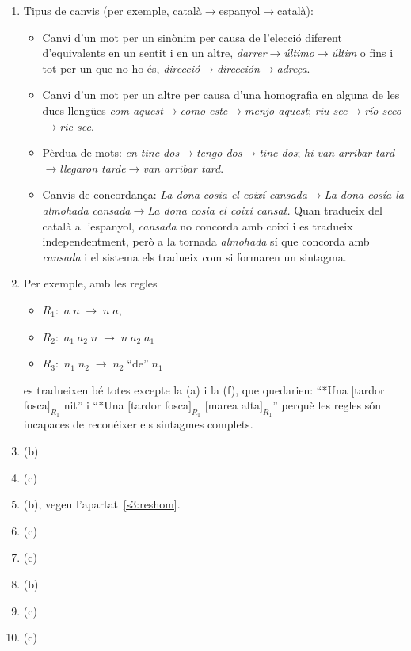 \begin{enumerate}
\item Tipus de canvis (per exemple, català$\to$espanyol$\to$català):
  \begin{itemize}
  \item Canvi d'un mot per un sinònim per causa de l'elecció diferent
    d'equivalents en un sentit i en un altre,
    \emph{darrer}$\to$\emph{último}$\to$\emph{últim} o fins i tot per
    un que no ho és,
    \emph{direcció}$\to$\emph{dirección}$\to$\emph{adreça}.
  \item Canvi d'un mot per un altre per causa d'una homografia en
    alguna de les dues llengües \emph{com aquest}$\to$\emph{como
      este}$\to$\emph{menjo aquest}; \emph{riu sec}$\to$\emph{río
      seco}$\to$\emph{ric sec}.
  \item Pèrdua de mots: \emph{en tinc dos}$\to$\emph{tengo
      dos}$\to$\emph{tinc dos}; \emph{hi van arribar
      tard}$\to$\emph{llegaron tarde}$\to$\emph{van arribar tard}.
  \item Canvis de concordança: \emph{La dona cosia el coixí
      cansada}$\to$\emph{La dona cosía la almohada
      cansada}$\to$\emph{La dona cosia el coixí cansat.} Quan tradueix
    del català a l'espanyol, \emph{cansada} no concorda amb coixí i es
    tradueix independentment, però a la tornada \emph{almohada} sí que
    concorda amb \emph{cansada} i el sistema els tradueix com si
    formaren un sintagma.
  \end{itemize}

\item Per exemple, amb les regles
  \begin{itemize}
  \item $R_1:$ $a\; n\;\to\; n\; a$,
  \item $R_2:$ $a_1\; a_2\; n\;\to\; n\; a_2\;
    a_1$ 
  \item $R_3:$  $n_1\; n_2\;\to\; n_2\; \mbox{``de''}\; n_1$
  \end{itemize}
  es tradueixen bé totes excepte la (a) i la (f), que quedarien:
  ``*Una $[$tardor fosca$]_{R_1}$ nit'' i ``*Una $[$tardor
  fosca$]_{R_1}$ $[$marea alta$]_{R_1}$'' perquè les regles són
  incapaces de reconéixer els sintagmes complets.


\item (b)
\item (c)
\item (b), vegeu l'apartat~\ref{s3:reshom}.
\item (c)
\item (c)
\item (b)
\item (c)
\item (c)


\end{enumerate}
